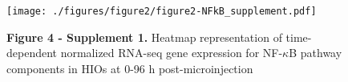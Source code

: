 \documentclass[9pt,lineo]{elife}
\date{\today}
\title{}
\begin{document}
\begin{figure}
\begin{fullwidth}
\centering\texttt{[image: ./figures/figure2/figure2-NFkB\_supplement.pdf]}
\caption*{\textbf{Figure 4 - Supplement 1. }Heatmap representation of time-dependent normalized RNA-seq gene expression for NF-$\kappa$B pathway components in HIOs at 0-96 h post-microinjection}
\label{fig:fullwidth}
\end{fullwidth}
\end{figure}
\end{document}
